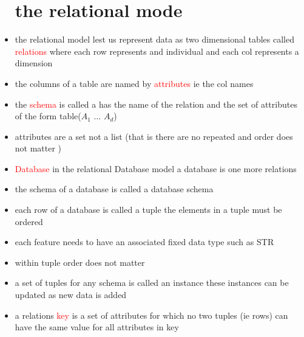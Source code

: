 \documentclass{article}
\begin{document}
\begin{itemize}
\section*{the relational mode }
\item the relational model lest us represent data as two dimensional tables called \textcolor{red}{relations} where each row represents and individual and each col represents a dimension
\item the columns of a table are named by  \textcolor{red}{attributes} ie the col names
\item the \textcolor{red}{schema} is called a has the name of the relation and the set of attributes of the form table($A_1$ ... $A_d$)
\item attributes are a set not a list (that is there are no repeated and order does not matter )
\item \textcolor{red}{Database} in the relational Database model a database is one more relations
\item the schema of a database is called a database schema 
\item each row of a database is called a tuple the elements in a tuple must be ordered
\item each feature needs to have an associated fixed data type such as STR 
\item within tuple order does not matter 
\item a set of tuples for any schema is called an instance these instances can be updated as new data is added 
\item a relations \textcolor{red}{key} is a set of attributes for which no two tuples (ie rows) can have the same value for all attributes in key 

\end{itemize}
\end{document}
